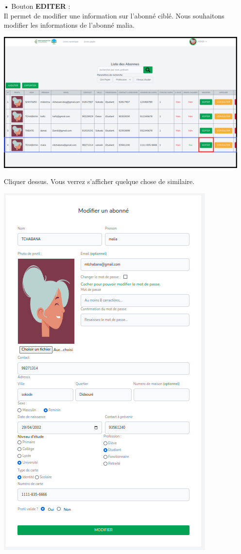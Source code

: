 \documentclass[12pt,a4paper]{article}
\begin{document}
\begin{itemize}
\item[•] Bouton \textbf{EDITER} : \\
Il permet de modifier une information sur l'abonné ciblé. Nous souhaitons modifier les informations de
l'abonné malia.
\begin{center}
\includegraphics[scale=0.33]{img/abonne_edit_btn.png}
\end{center}
Cliquer dessus. Vous verrez s'afficher quelque chose de similaire.
\begin{center}
\includegraphics[scale=0.8]{img/abonne_edit.png}

\end{center}
\end{itemize}
\end{document}
